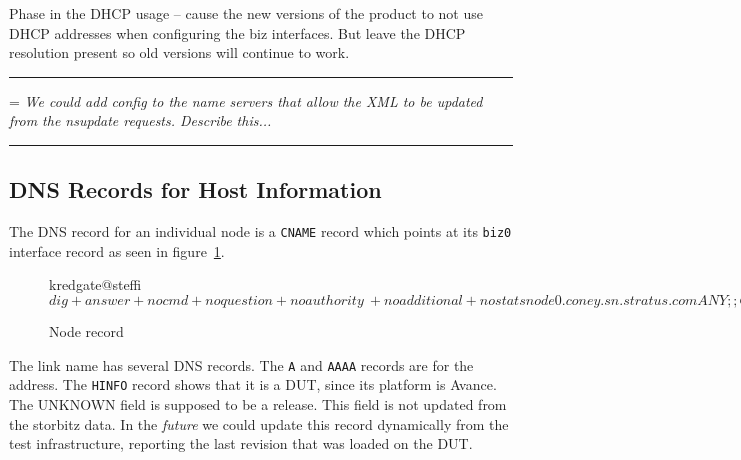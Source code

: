 \documentclass[twoside]{article}
\newenvironment{note}
{\begin{center}\begin{minipage}{0.8\textwidth}
\vspace{2ex}\hrule\vspace{1ex}
\parskip=\medskipamount
\em}
{\par 
\vspace{1ex}\hrule\vspace{2ex}
\end{minipage}\end{center}}
\begin{document}
Phase in the DHCP usage -- cause the new versions of the product to not
use DHCP addresses when configuring the biz interfaces.
But leave the DHCP resolution present so old versions will continue to work.

\begin{note}
We could add config to the name servers that allow the XML to be updated
from the nsupdate requests.
Describe this...
\end{note}

\subsection{DNS Records for Host Information}

The DNS record for an individual node is a \verb+CNAME+ record
which points at its \verb+biz0+ interface record as seen in
figure~\ref{dns:node:cname}.

\begin{figure}[!h]
\begin{center}
\begin{small}
\begin{boxedverbatim}
kredgate@steffi$ dig +answer +nocmd +noquestion +noauthority \
                 +noadditional +nostats node0.coney.sn.stratus.com ANY 
;; Got answer:
;; ->>HEADER<<- opcode: QUERY, status: NOERROR, id: 23354
;; flags: qr aa rd ra; QUERY: 1, ANSWER: 1, AUTHORITY: 1, ADDITIONAL: 12

;; ANSWER SECTION:
node0.coney.sn.stratus.com. 86400 IN    CNAME   biz0.node0.coney.sn.stratus.com.

kredgate@steffi$ 
\end{boxedverbatim}
\end{small}
\end{center}
\caption{Node record}\label{dns:node:cname}
\end{figure}

The link name has several DNS records.
The \verb+A+ and \verb+AAAA+ records are for the address.
The \verb+HINFO+ record shows that it is a DUT, since its platform is Avance.
The UNKNOWN field is supposed to be a release.
This field is not updated from the storbitz data.
In the {\em future} we could update this record dynamically from the
test infrastructure, reporting the last revision that was loaded
on the DUT.
\end{document}
